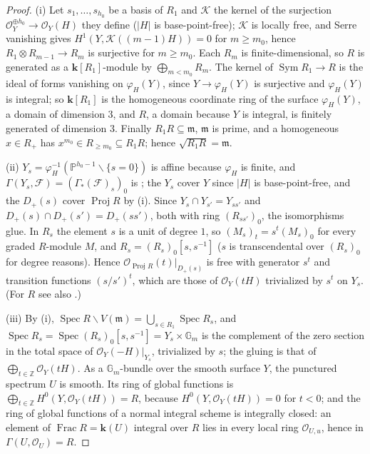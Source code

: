 \documentclass[11pt]{amsart}
\theoremstyle{remark}
\theoremstyle{definition}
\newcommand{\PP}{\mathbb{P}}
\newcommand{\ZZ}{\mathbb{Z}}
\newcommand{\bk}{\mathbf{k}}
\newcommand{\cO}{\mathcal{O}}
\newcommand{\cF}{\mathcal{F}}
\newcommand{\cK}{\mathcal{K}}
\DeclareMathOperator{\Proj}{Proj}
\DeclareMathOperator{\Spec}{Spec}
\DeclareMathOperator{\Sym}{Sym}
\begin{document}
\begin{proof}
(i) Let $s_1,\dots,s_{h_0}$ be a basis of $R_1$ and $\cK$ the kernel of the surjection $\cO_Y^{\oplus h_0}\to\cO_Y(H)$ they define ($|H|$ is base-point-free); $\cK$ is locally free, and Serre vanishing gives $H^1(Y,\cK((m-1)H))=0$ for $m\ge m_0$, hence $R_1\otimes R_{m-1}\to R_m$ is surjective for $m\ge m_0$. Each $R_m$ is finite-dimensional, so $R$ is generated as a $\bk[R_1]$-module by $\bigoplus_{m<m_0}R_m$. The kernel of $\Sym R_1\to R$ is the ideal of forms vanishing on $\varphi_H(Y)$, since $Y\to\varphi_H(Y)$ is surjective and $\varphi_H(Y)$ is integral; so $\bk[R_1]$ is the homogeneous coordinate ring of the surface $\varphi_H(Y)$, a domain of dimension $3$, and $R$, a domain because $Y$ is integral, is finitely generated of dimension $3$. Finally $R_1R\subseteq\mathfrak m$, $\mathfrak m$ is prime, and a homogeneous $x\in R_+$ has $x^{m_0}\in R_{\ge m_0}\subseteq R_1R$; hence $\sqrt{R_1R}=\mathfrak m$.

(ii) $Y_s=\varphi_H^{-1}(\PP^{h_0-1}\smallsetminus\{s=0\})$ is affine because $\varphi_H$ is finite, and $\Gamma(Y_s,\cF)=(\Gamma_*(\cF)_s)_0$ is \cite[Lem.~II.5.14]{Ha}; the $Y_s$ cover $Y$ since $|H|$ is base-point-free, and the $D_+(s)$ cover $\Proj R$ by (i). Since $Y_s\cap Y_{s'}=Y_{ss'}$ and $D_+(s)\cap D_+(s')=D_+(ss')$, both with ring $(R_{ss'})_0$, the isomorphisms glue. In $R_s$ the element $s$ is a unit of degree $1$, so $(M_s)_t=s^t(M_s)_0$ for every graded $R$-module $M$, and $R_s=(R_s)_0[s,s^{-1}]$ ($s$ is transcendental over $(R_s)_0$ for degree reasons). Hence $\cO_{\Proj R}(t)|_{D_+(s)}$ is free with generator $s^t$ and transition functions $(s/s')^t$, which are those of $\cO_Y(tH)$ trivialized by $s^t$ on $Y_s$. (For $R$ see also \cite[\S5]{GoWa}.)

(iii) By (i), $\Spec R\smallsetminus V(\mathfrak m)=\bigcup_{s\in R_1}\Spec R_s$, and $\Spec R_s=\Spec(R_s)_0[s,s^{-1}]=Y_s\times\mathbb G_m$ is the complement of the zero section in the total space of $\cO_Y(-H)|_{Y_s}$, trivialized by $s$; the gluing is that of $\bigoplus_{t\in\ZZ}\cO_Y(tH)$. As a $\mathbb G_m$-bundle over the smooth surface $Y$, the punctured spectrum $U$ is smooth. Its ring of global functions is $\bigoplus_{t\in\ZZ}H^0(Y,\cO_Y(tH))=R$, because $H^0(Y,\cO_Y(tH))=0$ for $t<0$; and the ring of global functions of a normal integral scheme is integrally closed: an element of $\operatorname{Frac}R=\bk(U)$ integral over $R$ lies in every local ring $\cO_{U,u}$, hence in $\Gamma(U,\cO_U)=R$.
\end{proof}
\end{document}
